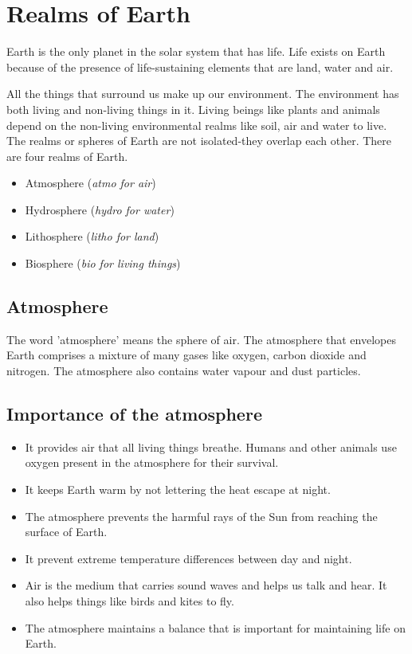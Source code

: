 \section{Realms of Earth}
Earth is the only planet in the solar system that has life. Life exists on Earth because of the presence of life-sustaining elements that are land, water and air.
\vspace{0.1in}
\par
All the things that surround us make up our environment. The environment has both living and non-living things in it. Living beings like plants and animals depend on the non-living environmental realms like soil, air and water to live. The realms or spheres of Earth are not isolated-they overlap each other. There are four realms of Earth.
\begin{itemize}
    \item Atmosphere (\textit{atmo for air})
    \item Hydrosphere (\textit{hydro for water})
    \item Lithosphere (\textit{litho for land})
    \item Biosphere (\textit{bio for living things})
\end{itemize}
\subsection{Atmosphere}
The word 'atmosphere' means the sphere of air. The atmosphere that envelopes Earth comprises a mixture of many gases like oxygen, carbon dioxide and nitrogen. The atmosphere also contains water vapour and dust particles.
\subsection{\textbf{Importance of the atmosphere}}
\begin{itemize}
    \item It provides air that all living things breathe. Humans and other animals use oxygen present in the atmosphere for their survival.
    \item It keeps Earth warm by not lettering the heat escape at night.
    \item The atmosphere prevents the harmful rays of the Sun from reaching the surface of Earth.
    \item It prevent extreme temperature differences between day and night.
    \item Air is the medium that carries sound waves and helps us talk and hear. It also helps things like birds and kites to fly.
    \item The atmosphere maintains a balance that is important for maintaining life on Earth.
\end{itemize}
